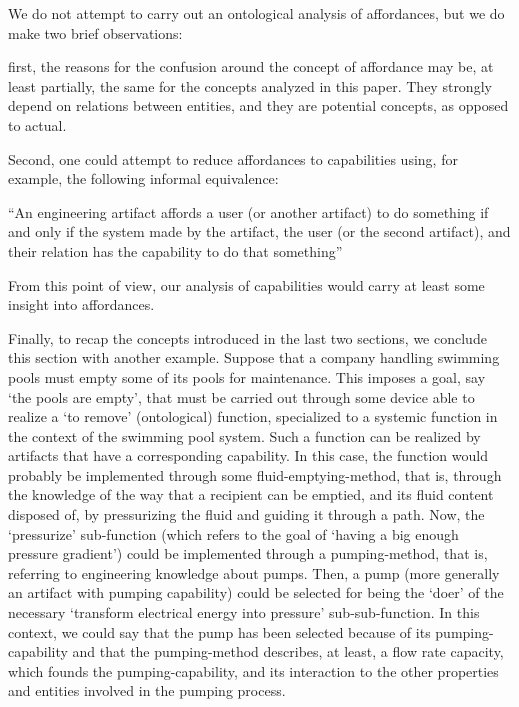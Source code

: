 \documentclass[sw]{iosart2x}
\newcommand{\bflist}{\begin{list}{}{\setlength{\topsep}{2mm}\setlength{\partopsep}{0mm}\setlength{\parsep}{0mm}\setlength{\leftmargin}{9mm}\setlength{\labelwidth}{8mm}}}
\newcommand{\eflist}{\end{list}}
\newcommand{\ExLabel}{\textrm{ex}}
\newcommand{\myex}[1]{\refstepcounter{cntex}\begin{small}{\bf \ExLabel\thecntex\label{ex:#1}}\end{small}}
\newcounter{cntex}
\newcommand{\mytext}[1]{``#1''}
\newcommand{\myComment}[1]{{\unskip \ignorespaces}}
\begin{document}
We do not attempt to carry out an ontological analysis of affordances, but we do make two brief observations:
\begin{itemize}
  \item first, the reasons for the confusion around the concept of affordance may be, at least partially, the same for the concepts analyzed in this paper. They strongly depend on relations between entities, and they are potential concepts, as opposed to actual.
  \item Second, one could attempt to reduce affordances to capabilities using, for example, the following informal equivalence:
  \bflist
    \item[\myex{affordances}] \mytext{An engineering artifact affords a user (or another artifact) to do something if and only if the system made by the artifact, the user (or the second artifact), and their relation has the capability to do that something}
  \eflist 
\end{itemize}
From this point of view, our analysis of capabilities would carry at least some insight into affordances.

Finally, to recap the concepts introduced in the last two sections, we conclude this section with another example.\myComment{\footnote{Notice again the similarity with the work of Kitamura, Sasajima, Mizoguchi et al. \cite{kitamuraOntologybasedDescriptionFunctional2003}.}} Suppose that a company handling swimming pools must empty some of its pools for maintenance. This imposes a goal, say `the pools are empty', that must be carried out through some device able to realize a `to remove' (ontological) function, specialized to a systemic function in the context of the swimming pool system.
Such a function can be realized by artifacts that have a corresponding capability. In this case, the function would probably be implemented through some fluid-emptying-method, that is, through the knowledge of the way that a recipient can be emptied, and its fluid content disposed of, by pressurizing the fluid and guiding it through a path.
Now, the `pressurize' sub-function (which refers to the goal of `having a big enough pressure gradient') could be implemented through a pumping-method, that is, referring to engineering knowledge about pumps.
Then, a pump (more generally an artifact with pumping capability) could be selected for being the `doer' of the necessary `transform electrical energy into pressure' sub-sub-function.
In this context, we could say that the pump has been selected because of its pumping-capability and that the pumping-method describes, at least, a flow rate capacity, which founds the pumping-capability, and its interaction to the other properties and entities involved in the pumping process. 
\end{document}
